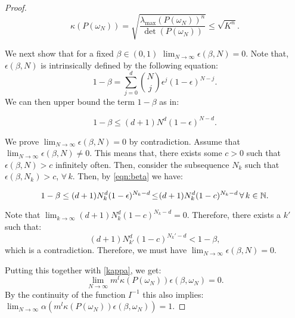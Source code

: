 \begin{proof}
\begin{equation}\label{kappa}
\kappa(P(\omega_N)) = \sqrt{\frac{\lambda_{\max}(P(\omega_N))^n}{\det(P(\omega_N))}} \leq \sqrt{K^n}.
\end{equation}

We next show that for a fixed $\beta \in (0,1)$ $\lim_{N \to \infty} \epsilon(\beta, N) = 0.$ Note that, $\epsilon(\beta, N)$ is intrinsically defined by the following equation:
$$1-\beta = \sum_{j=0}^d {{N}\choose{j}} \epsilon^j (1-\epsilon)^{N-j}.$$
We can then upper bound the term $1-\beta$ as in:

\begin{equation}\label{eqn:beta}
1-\beta \leq  (d+1)N^d (1-\epsilon)^{N-d}.
\end{equation}

We prove $\lim_{N \to \infty} \epsilon(\beta, N) = 0$ by contradiction. Assume that $\lim_{N \to \infty} \epsilon(\beta, N) \not= 0$. This means that, there exists some $c > 0$ such that $\epsilon(\beta, N) > c$ infinitely often. Then, consider the subsequence $N_k$ such that $\epsilon(\beta, N_k) > c$, $\forall\, k.$ Then, by \eqref{eqn:beta} we have:

\begin{equation*}
1-\beta\leq  (d+1)N_k^d (1-\epsilon)^{N_k-d}\hspace{-0.4mm} \leq \hspace{-0.7mm}(d+1)N_k^d (1-c)^{N_k-d}\, \forall\,k \in \mathbb{N}. 
\end{equation*}

Note that $\lim_{k \to \infty}(d+1)N_k^d (1-c)^{N_k-d} = 0.$ Therefore, there exists a $k'$ such that:
$$(d+1)N_{k'}^d (1-c)^{N_k'-d} < 1 - \beta,$$ which is a contradiction. Therefore, we must have  $\lim_{N \to \infty} \epsilon (\beta, N) = 0$.

Putting this together with \eqref{kappa}, we get:
$$\lim_{N \to \infty} m^l \kappa(P(\omega_N))\epsilon(\beta, \omega_N) = 0.$$ By the continuity of the function $I^{-1}$ this also implies: $\lim_{N \to \infty} \alpha(m^l \kappa(P(\omega_N)) \epsilon(\beta, \omega_N)) = 1.$


\end{proof}